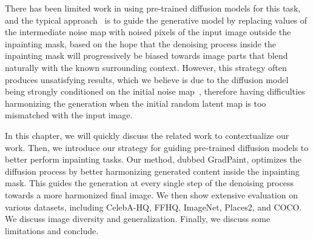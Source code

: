    There has been limited work in using pre-trained diffusion models for this task, and 
the typical approach~\citep{lugmayr2022repaint, meng2022sdedit, nichol2021glide} is to guide the generative 
model by replacing values of the intermediate noise map with noised pixels of the input 
image outside the inpainting mask, based on the hope that the denoising process inside 
the inpainting mask will progressively be biased towards image parts that blend 
naturally with the known surrounding context.
However, this strategy often produces unsatisfying results, which we believe is due to
 the diffusion model being strongly conditioned on the initial noise
  map~\citep{optimaltransport}, therefore having difficulties harmonizing the generation
   when the initial random latent map is too mismatched with the input image.


In this chapter, we will quickly discuss the related work to contextualize our work. 
Then, we introduce our strategy for guiding  pre-trained diffusion models
   to better perform inpainting tasks. Our method, dubbed GradPaint, optimizes the
    diffusion process by better harmonizing generated content inside the inpainting mask.
     This guides the generation at every single step of the denoising process towards a
      more harmonized final image. We then show extensive evaluation on various datasets, 
    including  CelebA-HQ\citep{karras2018progressive}, FFHQ\citep{karra2019stylegan}, ImageNet\citep{deng2009imagenet},
     Places2\citep{zhou2017places}, and COCO\citep{lin2014mscocodataset}. We discuss image diversity 
     and generalization. Finally, we discuss some limitations and conclude. 





